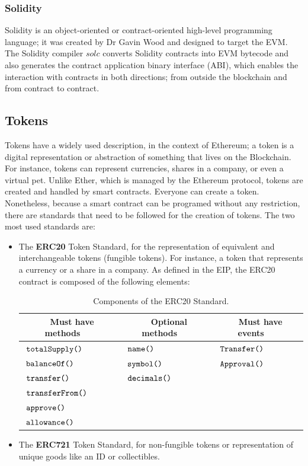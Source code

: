 \documentclass[11pt,a4paper]{report}
\begin{document}
\subsubsection{Solidity}
{Solidity}\cite{book:masteringETH-sc-solidity}\cite{solidity} is an object-oriented or contract-oriented high-level programming language; it was created by Dr Gavin Wood and designed to target the EVM.  The Solidity compiler $solc$ converts Solidity contracts into EVM bytecode and also generates the contract application binary interface (ABI)\cite{abi}, which enables the interaction with contracts in both directions; from outside the blockchain and from contract to contract.
 
\subsection{Tokens}\label{sec:tokens}
Tokens have a widely used description\cite{wiki:Token}, in the context of Ethereum; a token\cite{tokens} is a digital representation or abstraction of something that lives on the Blockchain. For instance, tokens can represent currencies, shares in a company, or even a virtual pet. Unlike Ether, which is managed by the Ethereum protocol, tokens are created and handled by smart contracts. Everyone can create a token. Nonetheless, because a smart contract can be programed without any restriction, there are standards that need to be followed for the creation of tokens. The two most used standards are:
\begin{itemize}
	\item The \textbf{ERC20} Token Standard\cite{erc20}, for the representation of equivalent and interchangeable tokens (fungible tokens). For instance, a token that represents a currency or a share in a company. As defined in the EIP\cite{erc20}, the ERC20 contract is composed of the following elements:
	\begin{table}[htp]
		\centering
		\begin{tabular}{|l|l|l|}
			\hline
			\multicolumn{1}{|c|}{\textbf{~Must have methods~~~}} & 
			\multicolumn{1}{|c|}{\textbf{~Optional methods~~~}}  &
			\multicolumn{1}{|c|}{\textbf{~Must have events~~~}} \\\hline
			$~\verb|totalSupply()|$& $~\verb|name()|$  & $~\verb|Transfer()|$  \\
			$~\verb|balanceOf()|$& $~\verb|symbol()|$ & $~\verb|Approval()|$  \\
			$~\verb|transfer()|$& $~\verb|decimals()|$  &  \\
			$~\verb|transferFrom()|$&  &   \\
			$~\verb|approve()|$&  &   \\
			$~\verb|allowance()|$&  &   \\\hline		 
		\end{tabular}
		\caption{Components of the ERC20 Standard.}
		\label{tab:erc20}
	\end{table}
	\item The \textbf{ERC721} Token Standard\cite{erc721}, for non-fungible tokens or representation of unique goods like an ID or collectibles.
\end{itemize}
\end{document}
